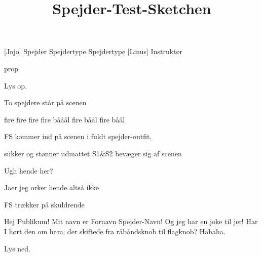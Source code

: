 \documentclass[a4paper,11pt]{article}
\title{Spejder-Test-Sketchen}
\begin{document}
\maketitle

\begin{roles}
[Jojo] Spejder
 Spejdertype
 Spejdertype
[Linus] Instruktør
\end{roles}

\begin{props}
\item prop
\end{props}

\begin{sketch}


\scene Lys op.

\scene To spejdere står på scenen


 fire fire fire fire bååål fire båål fire båål

\scene FS kommer ind på scenen i fuldt spejder-outfit.

 sukker og stønner udmattet
\scene S1\&S2 bevæger sig af scenen

 Ugh hende her?

 Jaer jeg orker hende altså ikke

\scene FS trækker på skuldrende

 Hej Publikum!
 Mit navn er Fornavn Spejder-Navn! Og jeg har en joke til jer! Har I hørt den om ham, der skiftede fra råbåndsknob til flagknob? Hahaha.

\scene Lys ned.


\end{sketch}
\end{document}
